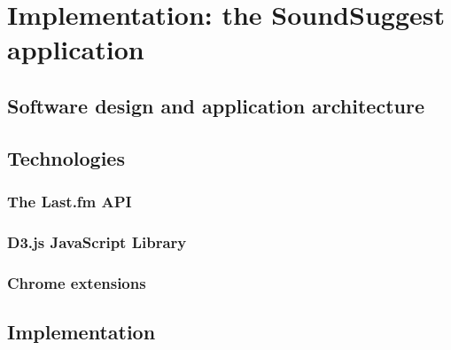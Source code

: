 \chapter{Implementation: the SoundSuggest application}\label{chapter:implementation}

\section{Software design and application architecture}\label{chapter:implementation:section:design}


\section{Technologies}\label{chapter:implementation:section:technologies}

\subsection{The Last.fm API}\label{chapter:implementation:section:technologies:subsection:lastfm}



\subsection{D3.js JavaScript Library}\label{chapter:implementation:section:technologies:subsection:d3js}



\subsection{Chrome extensions}\label{chapter:implementation:section:technologies:subsection:chrome}



\section{Implementation}\label{chapter:implementation:section:implementation}
